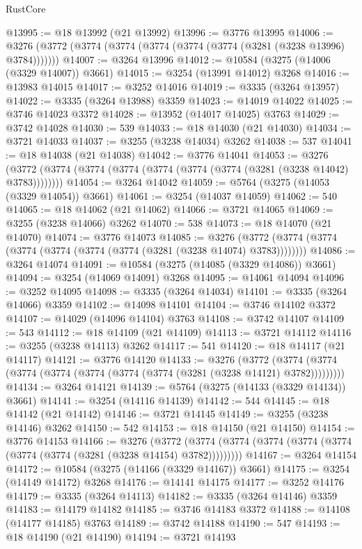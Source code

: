 \begin{lexlean}{RustCore}
\begin{coremodule}
@13995 := @18 @13992 (@21 @13992)
@13996 := @3776 @13995
@14006 := @3276 (@3772 (@3774 (@3774 (@3774 (@3774 (@3774 (@3281 (@3238 @13996) @3784)))))))
@14007 := @3264 @13996
@14012 := @10584 (@3275 (@14006 (@3329 @14007)) @3661)
@14015 := @3254 (@13991 @14012) @3268
@14016 := @13983 @14015
@14017 := @3252 @14016
@14019 := @3335 (@3264 @13957)
@14022 := @3335 (@3264 @13988) @3359
@14023 := @14019 @14022
@14025 := @3746 @14023 @3372
@14028 := @13952 (@14017 @14025) @3763
@14029 := @3742 @14028
@14030 := 539
@14033 := @18 @14030 (@21 @14030)
@14034 := @3721 @14033
@14037 := @3255 (@3238 @14034) @3262
@14038 := 537
@14041 := @18 @14038 (@21 @14038)
@14042 := @3776 @14041
@14053 := @3276 (@3772 (@3774 (@3774 (@3774 (@3774 (@3774 (@3774 (@3281 (@3238 @14042) @3783))))))))
@14054 := @3264 @14042
@14059 := @5764 (@3275 (@14053 (@3329 @14054)) @3661)
@14061 := @3254 (@14037 @14059)
@14062 := 540
@14065 := @18 @14062 (@21 @14062)
@14066 := @3721 @14065
@14069 := @3255 (@3238 @14066) @3262
@14070 := 538
@14073 := @18 @14070 (@21 @14070)
@14074 := @3776 @14073
@14085 := @3276 (@3772 (@3774 (@3774 (@3774 (@3774 (@3774 (@3774 (@3281 (@3238 @14074) @3783))))))))
@14086 := @3264 @14074
@14091 := @10584 (@3275 (@14085 (@3329 @14086)) @3661)
@14094 := @3254 (@14069 @14091) @3268
@14095 := @14061 @14094
@14096 := @3252 @14095
@14098 := @3335 (@3264 @14034)
@14101 := @3335 (@3264 @14066) @3359
@14102 := @14098 @14101
@14104 := @3746 @14102 @3372
@14107 := @14029 (@14096 @14104) @3763
@14108 := @3742 @14107
@14109 := 543
@14112 := @18 @14109 (@21 @14109)
@14113 := @3721 @14112
@14116 := @3255 (@3238 @14113) @3262
@14117 := 541
@14120 := @18 @14117 (@21 @14117)
@14121 := @3776 @14120
@14133 := @3276
    (@3772 (@3774 (@3774 (@3774 (@3774 (@3774 (@3774 (@3774 (@3281 (@3238 @14121) @3782)))))))))
@14134 := @3264 @14121
@14139 := @5764 (@3275 (@14133 (@3329 @14134)) @3661)
@14141 := @3254 (@14116 @14139)
@14142 := 544
@14145 := @18 @14142 (@21 @14142)
@14146 := @3721 @14145
@14149 := @3255 (@3238 @14146) @3262
@14150 := 542
@14153 := @18 @14150 (@21 @14150)
@14154 := @3776 @14153
@14166 := @3276
    (@3772 (@3774 (@3774 (@3774 (@3774 (@3774 (@3774 (@3774 (@3281 (@3238 @14154) @3782)))))))))
@14167 := @3264 @14154
@14172 := @10584 (@3275 (@14166 (@3329 @14167)) @3661)
@14175 := @3254 (@14149 @14172) @3268
@14176 := @14141 @14175
@14177 := @3252 @14176
@14179 := @3335 (@3264 @14113)
@14182 := @3335 (@3264 @14146) @3359
@14183 := @14179 @14182
@14185 := @3746 @14183 @3372
@14188 := @14108 (@14177 @14185) @3763
@14189 := @3742 @14188
@14190 := 547
@14193 := @18 @14190 (@21 @14190)
@14194 := @3721 @14193

\end{coremodule}
\end{lexlean}
